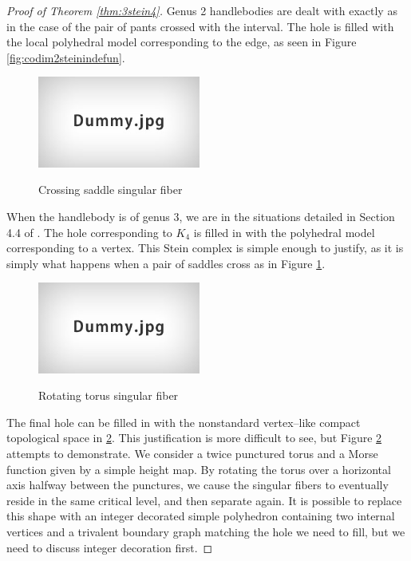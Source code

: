 \begin{proof}[Proof of Theorem \ref{thm:3stein4}]
	Genus 2 handlebodies are dealt with exactly as in the case of the pair of pants crossed with the interval.
	The hole is filled with the local polyhedral model corresponding to the edge, as seen in Figure \ref{fig:codim2steinindefun}.
	
	\begin{figure}
		\centering
		\captionsetup{justification=centering}
		\caption{Crossing saddle singular fiber}
		\includegraphics[height=3cm]{figures/dummy.jpg}
		\label{fig:crossingsaddles}
	\end{figure}
	
	When the handlebody is of genus 3, we are in the situations detailed in Section 4.4 of \cite{CostThur08}.
	The hole corresponding to $K_4$ is filled in with the polyhedral model corresponding to a vertex.
	This Stein complex is simple enough to justify, as it is simply what happens when a pair of saddles cross as in Figure \ref{fig:crossingsaddles}.

	\begin{figure}
		\centering
		\captionsetup{justification=centering}
		\caption{Rotating torus singular fiber}
		\includegraphics[height=3cm]{figures/dummy.jpg}
		\label{fig:doublecone}
	\end{figure}
	
	The final hole can be filled in with the nonstandard vertex--like compact topological space in \ref{fig:doublecone}.
	This justification is more difficult to see, but Figure \ref{fig:doublecone} attempts to demonstrate.
	We consider a twice punctured torus and a Morse function given by a simple height map.
	By rotating the torus over a horizontal axis halfway between the punctures, we cause the singular fibers to eventually reside in the same critical level, and then separate again.
	It is possible to replace this shape with an integer decorated simple polyhedron containing two internal vertices and a trivalent boundary graph matching the hole we need to fill, but we need to discuss integer decoration first.
	

\end{proof}
